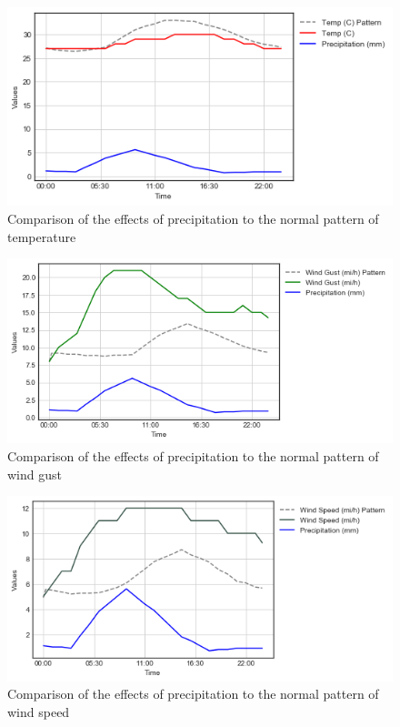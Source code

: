 \begin{figure}
  \includegraphics[width=\linewidth]{figures/figure_precip_temp.png}
  \caption{Comparison of the effects of precipitation to the normal pattern of temperature}
  \label{figure_precip_temp}
\end{figure}



\begin{figure}
  \includegraphics[width=\linewidth]{figures/figure_precip_windgust.png}
  \caption{Comparison of the effects of precipitation to the normal pattern of wind gust}
  \label{figure_precip_windgust}
\end{figure}







\begin{figure}
  \includegraphics[width=\linewidth]{figures/figure_precip_windspeed.png}
  \caption{Comparison of the effects of precipitation to the normal pattern of wind speed}
  \label{figure_precip_windspeed}
\end{figure}









